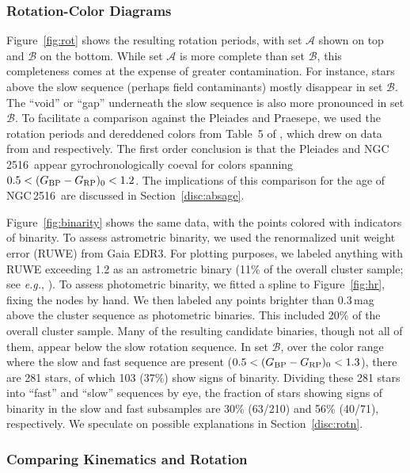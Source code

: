 \documentclass[12pt,twocolumn,tighten]{aastex63}
\newcommand{\cn}{NGC\,2516} %
\newcommand{\bpmrpo}{(G_{\rm BP}-G_{\rm RP})_0}
\begin{document}
\subsubsection{Rotation-Color Diagrams}

Figure~\ref{fig:rot} shows the resulting rotation
periods, with set $\mathcal{A}$ shown on top and $\mathcal{B}$ on
the bottom.  While set $\mathcal{A}$ is more complete than set
$\mathcal{B}$, this completeness comes at the expense of greater
contamination.  For instance, stars above the slow sequence (perhaps
field contaminants) mostly disappear in set $\mathcal{B}$.  The
``void'' or ``gap'' underneath the slow sequence is also more
pronounced in set $\mathcal{B}$.  To facilitate a comparison against
the Pleiades and Praesepe, we used the rotation periods and dereddened
colors from Table~5 of \citet{curtis_rup147_2020}, which drew on data
from \citet{rebull_rotation_2016a} and \citet{douglas_k2_2019}
respectively.  The first order conclusion is that the Pleiades and
\cn\ appear gyrochronologically coeval for colors spanning
$0.5<\bpmrpo<1.2$.  The implications of this comparison for the age of
\cn\ are discussed in Section~\ref{disc:absage}.

Figure~\ref{fig:binarity} shows the same data, with the
points colored with indicators of binarity.  To assess astrometric
binarity, we used the renormalized unit weight error (RUWE) from Gaia
EDR3.  For plotting purposes, we labeled anything with RUWE exceeding
1.2 as an astrometric binary (11\% of the overall cluster sample; see
{\it e.g.}, \citealt{belokurov_unresolved_2020}).  To assess
photometric binarity, we fitted a spline to Figure~\ref{fig:hr},
fixing the nodes by hand.  We then labeled any points brighter than
0.3\,mag above the cluster sequence as photometric binaries.  This
included 20\% of the overall cluster sample.  Many of the resulting
candidate binaries, though not all of them, appear below the slow
rotation sequence.  In set $\mathcal{B}$, over the color range where
the slow and fast sequence are present ($0.5<\bpmrpo<1.3$), there are
281 stars, of which 103 (37\%) show signs of binarity.  Dividing these
281 stars into ``fast'' and ``slow'' sequences by eye,  the fraction
of stars showing signs of binarity in the slow and fast subsamples are
30\% (63/210) and 56\% (40/71), respectively.  We speculate on
possible explanations in Section~\ref{disc:rotn}.


\subsubsection{Comparing Kinematics and Rotation}
\end{document}
